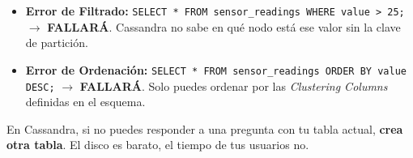 \documentclass[12pt,a4paper]{article}
\begin{document}
\begin{itemize}
    \item \textbf{Error de Filtrado:} \texttt{SELECT * FROM sensor\_readings WHERE value > 25;} $\rightarrow$ \textbf{FALLARÁ}. Cassandra no sabe en qué nodo está ese valor sin la clave de partición.
    \item \textbf{Error de Ordenación:} \texttt{SELECT * FROM sensor\_readings ORDER BY value DESC;} $\rightarrow$ \textbf{FALLARÁ}. Solo puedes ordenar por las \textit{Clustering Columns} definidas en el esquema.
\end{itemize}

\begin{tcolorbox}[title=La Regla de Oro, colframe=orange!75!black]
En Cassandra, si no puedes responder a una pregunta con tu tabla actual, \textbf{crea otra tabla}. El disco es barato, el tiempo de tus usuarios no.
\end{tcolorbox}
\end{document}
